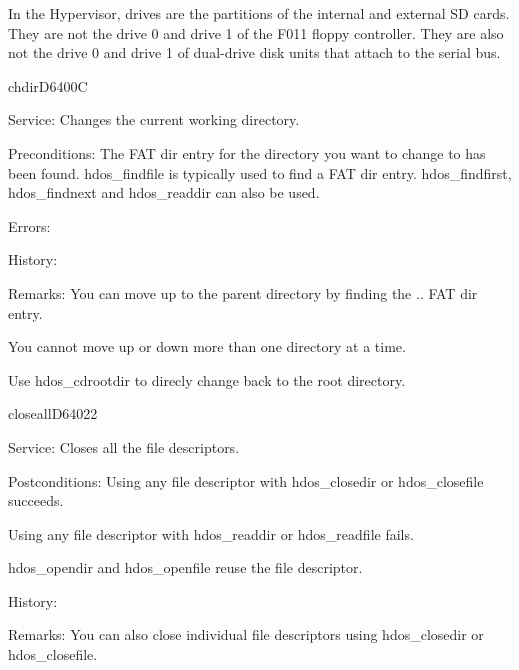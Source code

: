 
In the Hypervisor, drives are the partitions of the internal and external SD
cards. They are not the drive 0 and drive 1 of the F011 floppy controller. They
are also not the drive 0 and drive 1 of dual-drive disk units that attach to the
serial bus.


\begin{hyppotrap}{chdir}{D640}{0C}
\item [Service:]
  Changes the current working directory.
\item [Preconditions:]
  The FAT dir entry for the directory you want to change to has been
  found. hdos\_findfile is typically used to find a FAT dir entry.
  hdos\_findfirst, hdos\_findnext and hdos\_readdir can also be used.
\item [Errors:]
\item [History:]
\item [Remarks:]
  You can move up to the parent directory by finding the .. FAT dir entry.

  You cannot move up or down more than one directory at a time.

  Use hdos\_cdrootdir to direcly change back to the root directory.
\end{hyppotrap}


\newpage
\begin{hyppotrap}{closeall}{D640}{22}
\item [Service:]
  Closes all the file descriptors.
\item [Postconditions:]
  Using any file descriptor with hdos\_closedir or hdos\_closefile succeeds.

  Using any file descriptor with hdos\_readdir or hdos\_readfile fails.

  hdos\_opendir and hdos\_openfile reuse the file descriptor.
\item [History:]
\item [Remarks:]
  You can also close individual file descriptors using hdos\_closedir or
  hdos\_closefile.
\end{hyppotrap}


